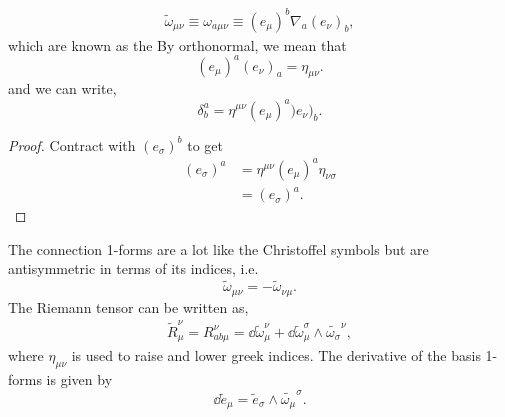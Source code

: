 \documentclass{article}
\numberwithin{equation}{section}
\begin{document}
\begin{align*}
    \tilde{\omega}_{\mu\nu} \equiv \omega_{a\mu \nu} \equiv (e_\mu)^b \nabla_a (e_\nu)_b,
\end{align*}
which are known as the  By orthonormal, we mean that 
\begin{equation*}
    (e_\mu)^a(e_\nu)_a = \eta_{\mu\nu}.
\end{equation*}
and we can write,
\begin{equation*}
    \delta^a_b = \eta^{\mu\nu}(e_\mu)^a)e_\nu)_b.
\end{equation*}
\begin{proof}
    Contract with $(e_\sigma)^b$ to get 
    \begin{align*}
        (e_\sigma)^a &= \eta^{\mu\nu} (e_\mu)^a \eta_{\nu\sigma} \\ 
        &= (e_\sigma)^a.
    \end{align*}
\end{proof}
The connection 1-forms are a lot like the Christoffel symbols but are antisymmetric in terms of its indices, i.e. 
\begin{equation*}
    \tilde{\omega}_{\mu\nu} = -\tilde{\omega}_{\nu\mu}.
\end{equation*}
The Riemann tensor can be written as,
\begin{align*}
    \tilde{R}_{\mu}^{\nu} = R_{ab\mu}^{\nu} = \dd{\tilde{\omega}_{\mu}^{\nu}} + \dd{\tilde{\omega}_\mu^{\sigma}} \wedge \tilde{\omega_\sigma}^{\nu},
\end{align*}
where $\eta_{\mu\nu}$ is used to raise and lower greek indices. The derivative of the basis 1-forms is given by
\begin{equation*}
    \dd{\tilde{e}_{\mu}} = \tilde{e}_{\sigma} \wedge \tilde{\omega_\mu}^{\sigma}.
\end{equation*}
\end{document}
